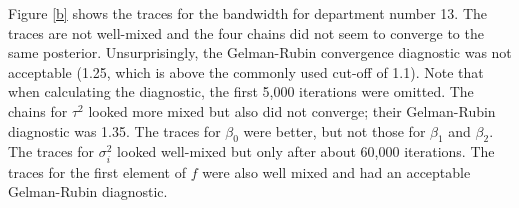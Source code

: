 \documentclass[paper=a4, fontsize=11pt]{scrartcl}
\begin{document}
Figure \ref{b} shows the traces for the bandwidth for department number 13. The traces are not well-mixed and the four chains did not seem to converge to the same posterior. Unsurprisingly, the Gelman-Rubin convergence diagnostic was not acceptable (1.25, which is above the commonly used cut-off of 1.1). Note that when calculating the diagnostic, the first 5,000 iterations were omitted. The chains for  $\tau^2$ looked more mixed but also did not converge; their Gelman-Rubin diagnostic was 1.35. The traces for $\beta_0$ were better, but not those for $\beta_1$ and $\beta_2$. The traces for $\sigma_i^2$ looked well-mixed but only after about 60,000 iterations. The traces for the first element of $f$ were also well mixed and had an acceptable Gelman-Rubin diagnostic.
\end{document}
